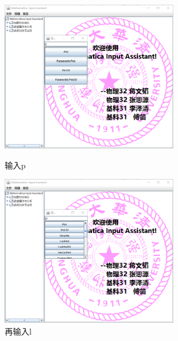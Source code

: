 \documentclass[hyperref, UTF8
,bookmarksnumbered=true, oneside]{ctexbook}
\begin{document}
            					\begin{figure}[!h]
	                \begin{minipage}[b]{0.45\textwidth}
	                \centering
	                \includegraphics[width=3in]{18.png}
	                \caption{输入p}
	                \label{pic:MathPack}
	                \end{minipage}%
	                \hspace{0.1\textwidth}%
	                \begin{minipage}[b]{0.45\textwidth}
	                \centering
	                \includegraphics[width=3in]{19.png}
	                \caption{再输入l}
	                \label{pic:GUIPack}
	                \end{minipage}
            	\end{figure}
\end{document}
